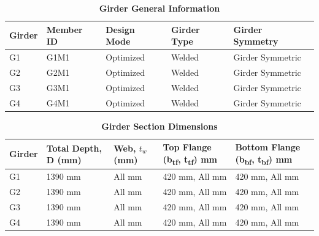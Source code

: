 \documentclass[12pt,a4paper]{report}
\numberwithin{table}{chapter}
\numberwithin{figure}{chapter}
\begin{document}
\newpage

\vspace{0.4em}
\noindent
            
\vspace{4pt}
\begin{longtable}{|L{2.2cm}|L{1.8cm}|p{3.8cm}|p{3.8cm}|p{3.8cm}|}
\caption{\textbf{Girder General Information}}
\hline
\textbf{Girder} & \textbf{Member ID} & \textbf{Design Mode} & \textbf{Girder Type} & \textbf{Girder Symmetry} \\[6pt]
\hline
G1 & G1M1 & Optimized & Welded & Girder Symmetric \\[8pt]
\hline
G2 & G2M1 & Optimized & Welded & Girder Symmetric \\[8pt]
\hline
G3 & G3M1 & Optimized & Welded & Girder Symmetric \\[8pt]
\hline
G4 & G4M1 & Optimized & Welded & Girder Symmetric \\[8pt]
\hline
\end{longtable}

\vspace{0.6em}

\vspace{4pt}
\begin{longtable}{|L{1.8cm}|L{2.3cm}|L{1.8cm}|p{4.8cm}|p{4.8cm}|}
\caption{\textbf{Girder Section Dimensions}}
\hline
\textbf{Girder} & \textbf{Total Depth, D (mm)} & \textbf{Web, $t_w$ (mm)} & \textbf{Top Flange (b\textsubscript{tf}, t\textsubscript{tf}) mm} & \textbf{Bottom Flange (b\textsubscript{bf}, t\textsubscript{bf}) mm} \\[6pt]
\hline
G1 & 1390 mm & All mm & 420 mm, All mm & 420 mm, All mm \\[8pt]
\hline
G2 & 1390 mm & All mm & 420 mm, All mm & 420 mm, All mm \\[8pt]
\hline
G3 & 1390 mm & All mm & 420 mm, All mm & 420 mm, All mm \\[8pt]
\hline
G4 & 1390 mm & All mm & 420 mm, All mm & 420 mm, All mm \\[8pt]
\hline
\end{longtable}

\vspace{0.6em}
\end{document}

